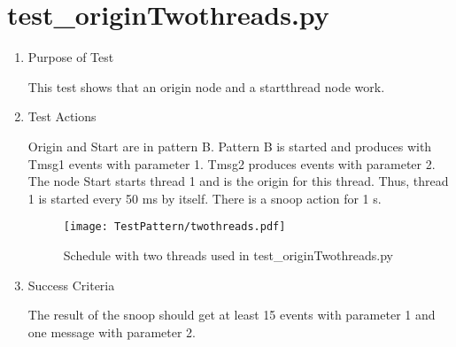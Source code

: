 \documentclass[12pt,a4paper]{report}
\begin{document}
\section{test\_originTwothreads.py}
\begin{enumerate}
  \item Purpose of Test

  This test shows that an origin node and a startthread node work.
  \item Test Actions

  Origin and Start are in pattern B.
  Pattern B is started and produces with Tmsg1 events with parameter 1. Tmsg2 produces events with parameter 2.
  The node Start starts thread 1 and is the origin for this thread. Thus, thread 1 is started every 50 ms by itself.
  There is a snoop action for 1 s.
    \begin{figure}
        \centering
        \texttt{[image: TestPattern/twothreads.pdf]}
        \caption{Schedule with two threads used in test\_originTwothreads.py}
        \label{fig:schedule_twoThreads}
    \end{figure}
  \item Success Criteria

  The result of the snoop should get at least 15 events with parameter 1 and one message with parameter 2.
\end{enumerate}
\end{document}
